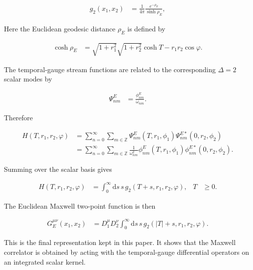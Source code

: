 \begin{align}
g_{2}(x_{1},x_{2})&=\frac{1}{4\pi}\frac{e^{-\rho_{E}}}{\sinh\rho_{E}},
\end{align}

Here the Euclidean geodesic distance $\rho_{E}$ is defined by

\begin{align}
\cosh\rho_{E}&=\sqrt{1+r_{1}^{2}}\sqrt{1+r_{2}^{2}}\cosh T-r_{1}r_{2}\cos\varphi.
\end{align}

The temporal-gauge stream functions are related to the corresponding $\Delta=2$ scalar modes by

\begin{align}
\Psi_{nm}^{E}&=\frac{\phi_{nm}^{E}}{\omega_{nm}}.
\end{align}

Therefore

\begin{align}
H(T,r_{1},r_{2},\varphi)&=\sum_{n=0}^{\infty}\sum_{m\in\mathbb{Z}}\Psi_{nm}^{E}(T,r_{1},\phi_{1})\Psi_{nm}^{E*}(0,r_{2},\phi_{2}) \\
&=\sum_{n=0}^{\infty}\sum_{m\in\mathbb{Z}}\frac{1}{\omega_{nm}^{2}}\phi_{nm}^{E}(T,r_{1},\phi_{1})\phi_{nm}^{E*}(0,r_{2},\phi_{2}).
\end{align}

Summing over the scalar basis gives

\begin{align}
H(T,r_{1},r_{2},\varphi)&=\int_{0}^{\infty}\mathrm{d}s\,s\,g_{2}(T+s,r_{1},r_{2},\varphi), &
T&\geq0.
\end{align}

The Euclidean Maxwell two-point function is then

\begin{align}
G_{E}^{\mu\nu}(x_{1},x_{2})&=D_{1}^{\mu}D_{2}^{\nu}\int_{0}^{\infty}\mathrm{d}s\,s\,g_{2}(|T|+s,r_{1},r_{2},\varphi).
\end{align}

This is the final representation kept in this paper. It shows that the Maxwell correlator is obtained by acting with the temporal-gauge differential operators on an integrated scalar kernel.
